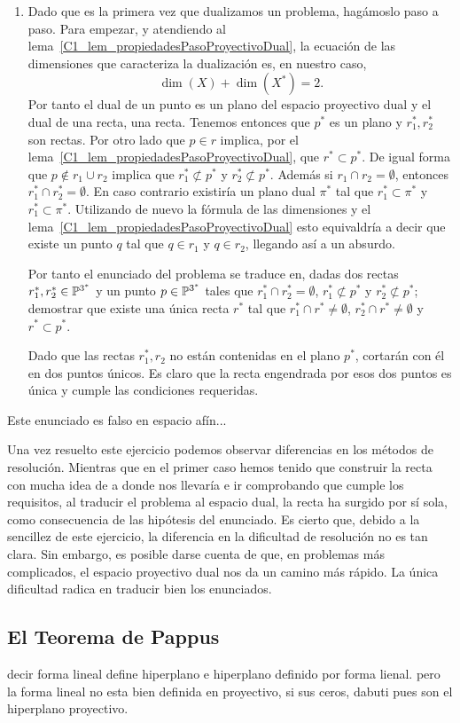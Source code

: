 \begin{exa}
\begin{enumerate}
		\item Dado que es la primera vez que dualizamos un problema, hagámoslo paso a paso. Para empezar, y atendiendo al lema~\ref{C1_lem_propiedadesPasoProyectivoDual}, la ecuación de las dimensiones que caracteriza la dualización es, en nuestro caso,
		\begin{equation*}
			\dim(X)+\dim(X^*)=2. 
		\end{equation*}
		Por tanto el dual de un punto es un plano del espacio proyectivo dual y el dual de una recta, una recta. Tenemos entonces que $p^*$ es un plano y $r_1^*,r_2^*$ son rectas. Por otro lado que $p\in r$ implica, por el lema~\ref{C1_lem_propiedadesPasoProyectivoDual}, que $r^*\subset p^*$. De igual forma que $p\not\in r_1\cup r_2$ implica que $r_1^*\not\subset p^*$ y $r_2^*\not\subset p^*$. Además si $r_1\cap r_2=\emptyset$, entonces $r_1^*\cap r_2^*=\emptyset$. En caso contrario existiría un plano dual $\pi^*$ tal que $r_1^*\subset\pi^*$ y $r_1^*\subset\pi^*$. Utilizando de nuevo la fórmula de las dimensiones y el lema~\ref{C1_lem_propiedadesPasoProyectivoDual} esto equivaldría a decir que existe un punto $q$ tal que $q\in r_1$ y $q\in r_2$, llegando así a un absurdo.
		
		Por tanto el enunciado del problema se traduce en, dadas dos rectas $r_1^*, r_2^*\in\mathbb{P}^{3^*}$ y un punto $p\in\mathbb{P}^{3^*}$ tales que $r_1^*\cap r_2^*=\emptyset$, $r_1^*\not\subset p^*$ y $r_2^*\not\subset p^*$; demostrar que existe una única recta $r^*$ tal que $r_1^*\cap r^*\not=\emptyset$, $r_2^*\cap r^*\not=\emptyset$ y $r^*\subset p^*$.
		
		Dado que las rectas $r_1^*, r_2$ no están contenidas en el plano $p^*$, cortarán con él en dos puntos únicos. Es claro que la recta engendrada por esos dos puntos es única y cumple las condiciones requeridas.
	\end{enumerate}
\end{exa}
\begin{obs}
	Este enunciado es falso en espacio afín...
\end{obs}
\begin{obs}
	Una vez resuelto este ejercicio podemos observar diferencias en los métodos de resolución. Mientras que en el primer caso hemos tenido que construir la recta con mucha idea de a donde nos llevaría e ir comprobando que cumple los requisitos, al traducir el problema al espacio dual, la recta ha surgido por sí sola, como consecuencia de las hipótesis del enunciado. Es cierto que, debido a la sencillez de este ejercicio, la diferencia en la dificultad de resolución no es tan clara. Sin embargo, es posible darse cuenta de que, en problemas más complicados, el espacio proyectivo dual nos da un camino más rápido. La única dificultad radica en traducir bien los enunciados.
\end{obs}

\subsection{El Teorema de Pappus}

decir forma lineal define hiperplano e hiperplano definido por forma lienal. pero la forma lineal no esta bien definida en proyectivo, si sus ceros, dabuti pues son el hiperplano proyectivo.